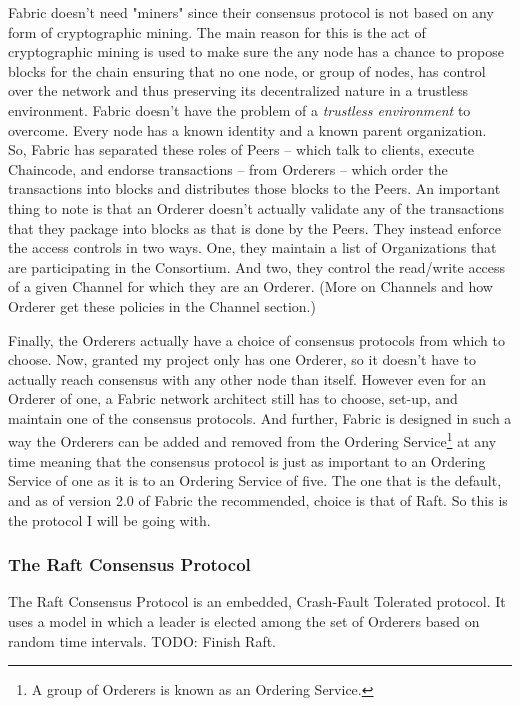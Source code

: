 		\hspace{10mm}Fabric doesn't need "miners" since their consensus protocol is not based on any form of cryptographic mining. The main reason for this is the act of cryptographic mining is used to make sure the any node has a chance to propose blocks for the chain ensuring that no one node, or group of nodes, has control over the network and thus preserving its decentralized nature in a trustless environment. Fabric doesn't have the problem of a \textit{trustless environment} to overcome. Every node has a known identity and a known parent organization.\\
		
		\hspace{10mm}So, Fabric has separated these roles of Peers -- which talk to clients, execute Chaincode, and endorse transactions -- from Orderers -- which order the transactions into blocks and distributes those blocks to the Peers. An important thing to note is that an Orderer doesn't actually validate any of the transactions that they package into blocks as that is done by the Peers. They instead enforce the access controls in two ways. One, they maintain a list of Organizations that are participating in the Consortium. And two, they control the read/write access of a given Channel for which they are an Orderer. (More on Channels and how Orderer get these policies in the Channel section.)
		
		\hspace{10mm}Finally, the Orderers actually have a choice of  consensus protocols from which to choose. Now, granted my project only has one Orderer, so it doesn't have to actually reach consensus with any other node than itself. However even for an Orderer of one, a Fabric network architect still has to choose, set-up, and maintain one of the consensus protocols. And further, Fabric is designed in such a way the Orderers can be added and removed from the Ordering Service\footnote{A group of Orderers is known as an Ordering Service.} at any time meaning that the consensus protocol is just as important to an Ordering Service of one as it is to an Ordering Service of five. The one that is the default, and as of version 2.0 of Fabric the recommended, choice is that of Raft. So this is the protocol I will be going with.\\
		
		\subsubsection{The Raft Consensus Protocol}
			\hspace{10mm}The Raft Consensus Protocol is an embedded, Crash-Fault Tolerated protocol. It uses a model in which a leader is elected among the set of Orderers based on random time intervals. TODO: Finish Raft.\\
			
